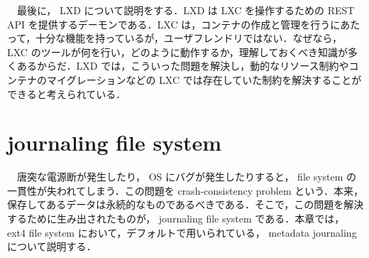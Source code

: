 \documentclass[graduation-thesis]{jsarticle}
\begin{document}
　最後に， LXD について説明をする．LXD は LXC を操作するための REST API を提供するデーモンである．LXC は，コンテナの作成と管理を行うにあたって，十分な機能を持っているが，ユーザフレンドリではない．なぜなら， LXC のツールが何を行い，どのように動作するか，理解しておくべき知識が多くあるからだ．LXD では，こういった問題を解決し，動的なリソース制約やコンテナのマイグレーションなどの LXC では存在していた制約を解決することができると考えられている．
　
\clearpage
\section{journaling file system}
\label{sec:journaling}
　唐突な電源断が発生したり， OS にバグが発生したりすると， file system の一貫性が失われてしまう．この問題を crash-consistency problem という．本来，保存してあるデータは永続的なものであるべきである．そこで，この問題を解決するために生み出されたものが， journaling file system である．本章では， ext4 file system において，デフォルトで用いられている， metadata journaling について説明する．
\end{document}
